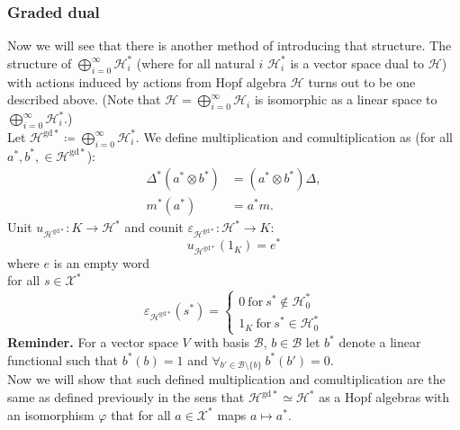 \documentclass[a4paper, 12pt]{article}
\newcommand{\gdd}[1]{#1^{\mathrm{gd}*}}
\begin{document}
\subsubsection{Graded dual}
Now we will see that there is another method of introducing that structure.
The structure of $\displaystyle\bigoplus^{\infty}_{i = 0} \mathcal{H}_i^*$ (where for all natural $i$
$\mathcal{H}_i^*$ is a vector space dual to $\mathcal{H}$) with actions induced by actions
from Hopf algebra $\mathcal{H}$ turns out to be one described above. (Note that $\mathcal{H} =
\displaystyle\bigoplus^{\infty}_{i = 0} \mathcal{H}_i$ is isomorphic as a linear space
to $\displaystyle\bigoplus^{\infty}_{i = 0} \mathcal{H}_i^*$.) \\
\indent Let $\gdd{\mathcal{H}} \coloneqq \displaystyle\bigoplus^{\infty}_{i = 0} \mathcal{H}_i^*$.
We define multiplication
\text{$\Delta^* : \mathcal{H}^{\mathrm{gd}*} \otimes \gdd{\mathcal{H}} \to \gdd{\mathcal{H}}$} and
comultiplication
\text{$m^* : \gdd{\mathcal{H}} \to \gdd{\mathcal{H}} \otimes \gdd{\mathcal{H}}$} as
(for all $a^*, b^*, \in \gdd{\mathcal{H}}$):
\begin{align*}
\Delta^*(a^* \otimes b^*) &= (a^* \otimes b^*)\Delta, \\
m^*(a^*) &= a^*m.
\end{align*}
Unit $u_{\gdd{\mathcal{H}}} : K \to \mathcal{H}^*$ and counit $\varepsilon_{\gdd{\mathcal{H}}}
: \mathcal{H}^* \to K$:
\begin{equation*}
u_{\gdd{\mathcal{H}}}(1_K) = e^*
\end{equation*}
where $e$ is an empty word \\
for all $s \in \mathcal{X}^*$
\begin{equation*}
\varepsilon_{\gdd{\mathcal{H}}}(s^*) = \begin{cases}
0 \mathrm{\ for\ } s^* \notin \mathcal{H}^*_0 \\
1_K \mathrm{\ for\ } s^* \in \mathcal{H}^*_0
\end{cases}
\end{equation*}
\indent\textbf{Reminder. } For a vector space $V$ with basis $\mathcal{B}$,
$b \in \mathcal{B}$ let $b^*$
denote a linear functional such that $b^*(b) = 1$ and
$\forall_{b' \in \mathcal{B}\setminus \{b\}}\ b^*(b') = 0$. \\[8pt]
Now we will show that such defined multiplication and comultiplication are the same as defined previously
in the sens that $\gdd{\mathcal{H}} \simeq \mathcal{H}^*$ as a Hopf algebras with an isomorphism $\varphi$
that for all $a \in \mathcal{X}^*$ maps $a \mapsto a^*$.
\end{document}
